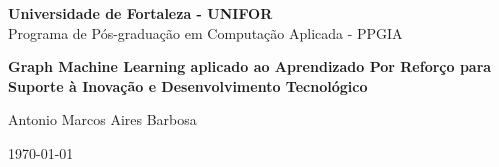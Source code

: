 \documentclass{article}
\begin{document}
\begin{titlepage}
    \centering
    \vspace*{1cm} %
    {\large \textbf{Universidade de Fortaleza - UNIFOR}\\ Programa de Pós-graduação em Computação Aplicada - PPGIA}
      
    \vspace*{4cm} %
    
    \begin{spacing}{1.5}
    \Huge \textbf{Graph Machine Learning aplicado ao Aprendizado Por Reforço para Suporte à Inovação e Desenvolvimento Tecnológico}
    \end{spacing}
    
    \vspace*{4cm} %
    
    {\large Antonio Marcos Aires Barbosa} %

    \vfill %
    
    {\large \today} %
\end{titlepage}

\thispagestyle{empty} %

\clearpage
{} %

\tableofcontents

\clearpage
{} %

\begin{spacing}{1.5}











\end{spacing}
\end{document}
